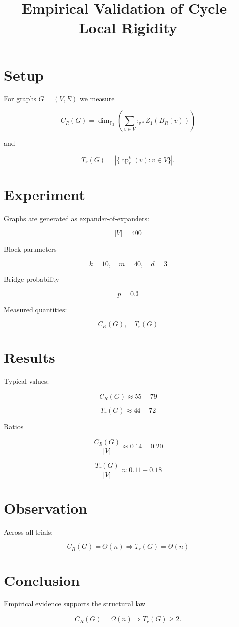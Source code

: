 \documentclass{article}
\begin{document}
\title{Empirical Validation of Cycle--Local Rigidity}
\date{}
\maketitle

\section*{Setup}

For graphs $G=(V,E)$ we measure

\[
C_R(G)=
\dim_{\mathbb F_2}
\left(
\sum_{v\in V}\iota_{v*}Z_1(B_R(v))
\right)
\]

and

\[
T_r(G)=
|\{\operatorname{tp}^k_r(v):v\in V\}|.
\]

\section*{Experiment}

Graphs are generated as expander-of-expanders:

\[
|V|=400
\]

Block parameters

\[
k=10,\quad m=40,\quad d=3
\]

Bridge probability

\[
p=0.3
\]

Measured quantities:

\[
C_R(G),\quad T_r(G)
\]

\section*{Results}

Typical values:

\[
C_R(G)\approx 55-79
\]

\[
T_r(G)\approx 44-72
\]

Ratios

\[
\frac{C_R(G)}{|V|}\approx 0.14-0.20
\]

\[
\frac{T_r(G)}{|V|}\approx 0.11-0.18
\]

\section*{Observation}

Across all trials:

\[
C_R(G)=\Theta(n)
\Rightarrow
T_r(G)=\Theta(n)
\]

\section*{Conclusion}

Empirical evidence supports the structural law

\[
C_R(G)=\Omega(n)
\Rightarrow
T_r(G)\ge2.
\]
\end{document}
